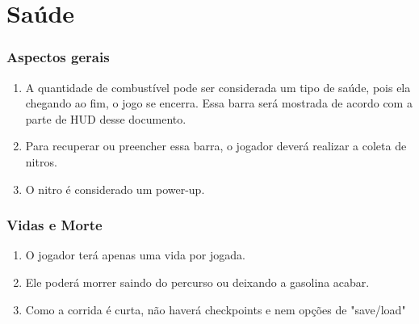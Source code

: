 \part{Saúde}

\section{Aspectos gerais}

\begin{enumerate}

	\item A quantidade de combustível pode ser considerada um tipo de saúde, pois ela chegando ao fim, o jogo se encerra. Essa barra será mostrada de acordo com a parte de HUD desse documento.
	\item Para recuperar ou preencher essa barra, o jogador deverá realizar a coleta de nitros.
	\item O nitro é considerado um power-up.
	
\end{enumerate}

\section{Vidas e Morte}

\begin{enumerate}

	\item O jogador terá apenas uma vida por jogada.
	\item Ele poderá morrer saindo do percurso ou deixando a gasolina acabar.
	\item Como a corrida é curta, não haverá checkpoints e nem opções de "save/load"

\end{enumerate}
